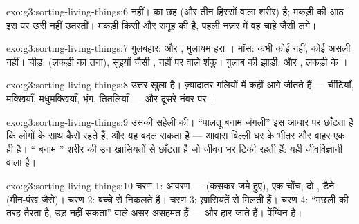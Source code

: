 \begin{solution}{exo:g3:sorting-living-things:6}
नहीं।  का  छह  (और तीन हिस्सों वाला शरीर) है; मकड़ी की
आठ  इस पर खरी नहीं उतरतीं। मकड़ी किसी और समूह की है, पहली नज़र
में वह चाहे जैसी लगे।
\end{solution}

\begin{solution}{exo:g3:sorting-living-things:7}
गुलबहार:  और , मुलायम हरा । मॉस: कभी कोई  नहीं, कोई असली
 नहीं। चीड़:  (लकड़ी का तना), सुइयों जैसी ,  नहीं
पर  वाले शंकु। गुलाब की झाड़ी:  और , लकड़ी के ।
\end{solution}

\begin{solution}{exo:g3:sorting-living-things:8}
उत्तर खुला है। ज़्यादातर गलियों में  कहीं आगे जीतते हैं --- चींटियाँ,
मक्खियाँ, मधुमक्खियाँ, भृंग, तितलियाँ --- और दूसरे नंबर पर ।
\end{solution}

\begin{solution}{exo:g3:sorting-living-things:9}
उसकी सहेली की। ``पालतू बनाम जंगली'' इस आधार पर छाँटता है कि  लोगों
के साथ कैसे रहते हैं, और यह बदल सकता है --- आवारा बिल्ली घर के भीतर
और बाहर एक ही  है। `` बनाम '' शरीर की उन ख़ासियतों से
छाँटता है जो जीवन भर टिकी रहती हैं: यही जीवविज्ञानी वाला  है।
\end{solution}

\begin{solution}{exo:g3:sorting-living-things:10}
चरण 1: आवरण ---  (कसकर जमे हुए), एक चोंच, दो , डैने (मीन-पंख
जैसे)। चरण 2: बच्चे  से निकलते हैं। चरण 3: ख़ासियतें  से
मिलती हैं। चरण 4: ``मछली की तरह तैरता है, उड़ नहीं सकता'' वाले असर
असहमत हैं --- और हार जाते हैं। पेंग्विन  है।
\end{solution}
